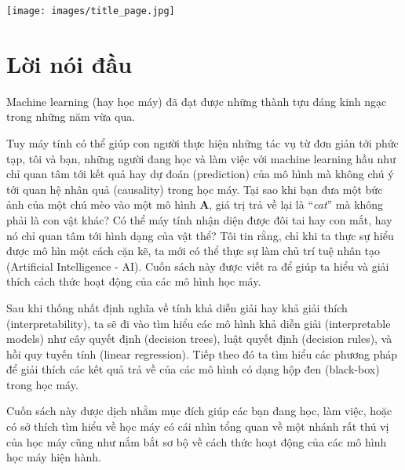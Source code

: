 \maketitle
\begin{figure*}[h!]
	\centering
	\texttt{[image: images/title\_page.jpg]}
\end{figure*}

\chapter*{Lời nói đầu}
Machine learning (hay học máy) đã đạt được những thành tựu đáng kinh ngạc trong những năm vừa qua. 

Tuy máy tính có thể giúp con người thực hiện những tác vụ từ đơn giản tới phức tạp, tôi và bạn, những người đang học và làm việc với machine learning hầu như chỉ quan tâm tới kết quả hay dự đoán (prediction) của mô hình mà không chú ý tới quan hệ nhân quả (causality) trong học máy. Tại sao khi bạn đưa một bức ảnh của một chú mèo vào một mô hình \textbf{A}, giá trị trả về lại là ``\textit{cat}'' mà không phải là con vật khác? Có thể máy tính nhận diện được đôi tai hay con mắt, hay nó chỉ quan tâm tới hình dạng của vật thể? Tôi tin rằng, chỉ khi ta thực sự hiểu được mô hìn một cách cặn kẽ, ta mới có thể thực sự làm chủ trí tuệ nhân tạo (Artificial Intelligence - AI). Cuốn sách này được viết ra để giúp ta hiểu và giải thích cách thức hoạt động của các mô hình học máy.

Sau khi thống nhất định nghĩa về tính khả diễn giải hay khả giải thích (interpretability), ta sẽ đi vào tìm hiểu các mô hình khả diễn giải (interpretable models) như cây quyết định (decision trees), luật quyết định (decision rules), và hồi quy tuyến tính (linear regression). Tiếp theo đó ta tìm hiểu các phương pháp để giải thích các kết quả trả về của các mô hình có dạng hộp đen (black-box) trong học máy.

Cuốn sách này được dịch nhằm mục đích giúp các bạn đang học, làm việc, hoặc có sở thích tìm hiểu về học máy có cái nhìn tổng quan về một nhánh rất thú vị của học máy cũng như nắm bắt sơ bộ về cách thức hoạt động của các mô hình học máy hiện hành.  

